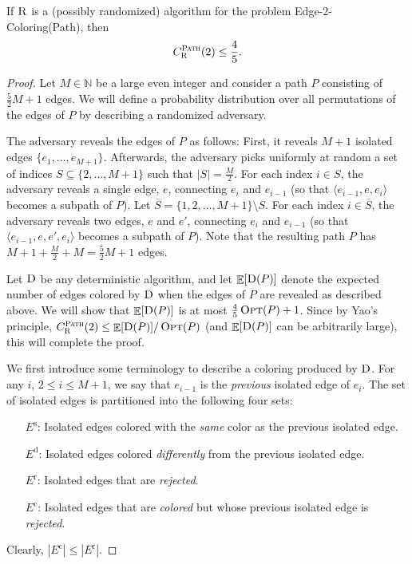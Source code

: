 \documentclass[smallextended]{svjour3}
\def\mcpath{{\sc Edge-$2$-Coloring(Path)}\xspace}
\def\paths{\text{\sc Path}\xspace}
\newcommand{\OPT}{\ensuremath{\operatorname{\textsc{Opt}}}\xspace}
\newcommand{\algo}[1]{\ensuremath{\operatorname{\textsc{#1}}}\xspace}
\newcommand{\ab}[1] {\left\vert #1\right\vert}
\DeclareMathOperator{\E}{\mathbb{E}}
\newcommand{\eis}{\ensuremath{E^{\text{s}}}\xspace}
\newcommand{\eid}{\ensuremath{E^{\text{d}}}\xspace}
\newcommand{\eir}{\ensuremath{E^{\text{r}}}\xspace}
\newcommand{\eic}{\ensuremath{E^{\text{c}}}\xspace}
\begin{document}
\begin{theorem}
\label{yao}
If $\algo{R}$ is a (possibly randomized) algorithm for the problem \mcpath, then
 $$C_{\algo{R}}^{\paths}(2) \leq \frac{4}{5}.$$
\end{theorem}
\begin{proof}
 Let $M\in\mathbb{N}$ be a large even integer and consider a path $P$ consisting of $\frac{5}{2}M+1$ edges. We will define a probability distribution over all permutations of the edges of $P$ by describing a randomized adversary.
 
The adversary reveals the edges of $P$ as follows: First, it reveals $M+1$ isolated edges  $\{e_1,\ldots , e_{M+1}\}$. Afterwards, the adversary picks uniformly at random a set of indices $S\subseteq\{2,\ldots , M+1\}$ such that $\ab{S}=\frac{M}{2}$. For each index $i\in S$, the adversary reveals a single edge, $e$, connecting $e_{i}$ and $e_{i-1}$ (so that $\langle e_{i-1}, e, e_{i}\rangle $ becomes a subpath of $P$). 
Let $\overline{S} = \{1,2,\ldots,M+1\} \setminus S$.
For each index $i\in \overline{S}$, the adversary reveals two edges, $e$ and $e'$, connecting $e_{i}$ and $e_{i-1}$ (so that $\langle e_{i-1},e,e',e_i\rangle$ becomes a subpath of $P$). Note that the resulting path $P$ has $M+1+\frac{M}{2}+M=\frac{5}{2}M+1$ edges.

Let $\algo{D}$ be any deterministic algorithm, and let $\E[\algo{D}(P)]$ denote the expected number of edges colored by $\algo{D}$ when the edges of $P$ are revealed as described above. We will show that
 $\E[\algo{D}(P)]$ is at most \mbox{$\frac{4}{5}\OPT(P)+1$}. 
Since by Yao's principle, $C_{\algo{R}}^{\paths}(2) \leq \E[\algo{D}(P)]/\OPT(P)$ (and $\E[\algo{D}(P)]$ can be arbitrarily large), this will complete the proof. 

We first introduce some terminology to describe a coloring produced by $\algo{D}$.
For any $i$, $2 \leq i \leq M+1$, we say that $e_{i-1}$ is the \emph{previous} isolated edge of $e_{i}$. 
The set of isolated edges is partitioned into the following four sets:
\begin{enumerate}[\eis:]
\item[\eis:] Isolated edges colored with the {\em same} color as the previous isolated edge. 
\item[\eid:] Isolated edges colored {\em differently} from the previous isolated edge. 
\item[\eir:] Isolated edges that are {\em rejected}.
\item[\eic:] Isolated edges that are {\em colored} but whose previous isolated edge is {\em rejected}. 
\end{enumerate}
Clearly, $|\eic| \leq |\eir|$. 


\end{proof}
\end{document}
